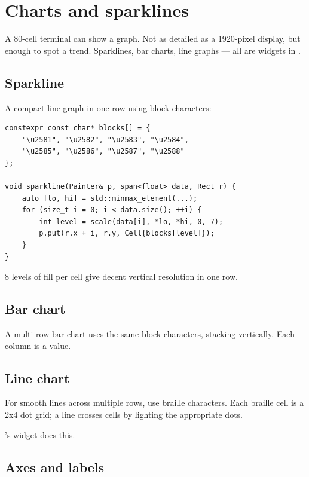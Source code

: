 \chapter{Charts and sparklines}
\label{ch:charts}

\begin{aside}
A 80-cell terminal can show a graph. Not as detailed as a
1920-pixel display, but enough to spot a trend. Sparklines,
bar charts, line graphs --- all are widgets in \maya{}.
\end{aside}

\section{Sparkline}

A compact line graph in one row using block characters:

\begin{lstlisting}
constexpr const char* blocks[] = {
    "\u2581", "\u2582", "\u2583", "\u2584",
    "\u2585", "\u2586", "\u2587", "\u2588"
};

void sparkline(Painter& p, span<float> data, Rect r) {
    auto [lo, hi] = std::minmax_element(...);
    for (size_t i = 0; i < data.size(); ++i) {
        int level = scale(data[i], *lo, *hi, 0, 7);
        p.put(r.x + i, r.y, Cell{blocks[level]});
    }
}
\end{lstlisting}

8 levels of fill per cell give decent vertical resolution
in one row.

\section{Bar chart}

A multi-row bar chart uses the same block characters,
stacking vertically. Each column is a value.

\section{Line chart}

For smooth lines across multiple rows, use braille
characters. Each braille cell is a 2x4 dot grid; a line
crosses cells by lighting the appropriate dots.

\maya{}'s  widget does this.

\section{Axes and labels}

